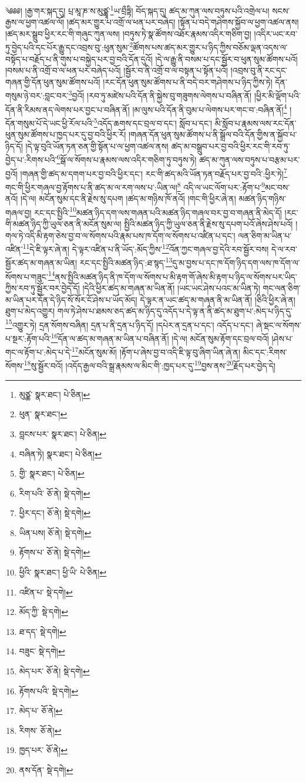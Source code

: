 \setcounter{footnote}{0} 
༄༅༅། །རྒྱ་གར་སྐད་དུ། པྲ་མཱ་ཎ་ས་མུཙྪཱ་\footnote{མུཙྪ་  སྣར་ཐང་།  པེ་ཅིན། }ཡ་བྲྀཏྟི། བོད་སྐད་དུ། ཚད་མ་ཀུན་ལས་བཏུས་པའི་འགྲེལ་པ། སངས་རྒྱས་ལ་ཕྱག་འཚལ་ལོ། །ཚད་མར་གྱུར་པ་འགྲོ་ལ་ཕན་པར་བཞེད། །སྟོན་པ་བདེ་གཤེགས་སྐྱོབ་ལ་ཕྱག་འཚལ་ནས། །ཚད་མར་སྒྲུབ་ཕྱིར་རང་གི་གཞུང་ཀུན་ལས། །བཏུས་ཏེ་སྣ་ཚོགས་འཐོར་རྣམས་འདིར་གཅིག་བྱ། །འདིར་ཡང་རབ་ཏུ་བྱེད་པའི་དང་པོར་རྒྱུ་དང་འབྲས་བུ་:ཕུན་སུམ་\footnote{ཕུན་  སྣར་ཐང་། }ཚོགས་པས་ཚད་མར་གྱུར་པ་ཉིད་ཀྱིས་བཅོམ་ལྡན་འདས་ལ་བསྟོད་པ་བརྗོད་པ་ནི་གུས་པ་བསྐྱེད་པར་བྱ་བའི་དོན་དུའོ། །དེ་ལ་རྒྱུ་ནི་བསམ་པ་དང་སྦྱོར་བ་ཕུན་སུམ་ཚོགས་པའོ། །བསམ་པ་ནི་འགྲོ་བ་ལ་ཕན་པར་བཞེད་པའོ། །སྦྱོར་བ་ནི་འགྲོ་བ་ལ་བསྟན་པ་སྟོན་པའོ། །འབྲས་བུ་ནི་རང་དང་གཞན་གྱི་དོན་ཕུན་སུམ་ཚོགས་པའོ། །རང་དོན་ཕུན་སུམ་ཚོགས་པ་ནི་བདེ་བར་གཤེགས་པ་ཉིད་ཀྱིས་ཏེ། དོན་གསུམ་ཉེ་བར་:བླང་བར་\footnote{བླངས་པར་  སྣར་ཐང་།  པེ་ཅིན། }བྱའོ། །རབ་ཏུ་མཛེས་པའི་དོན་ནི་སྐྱེས་བུ་གཟུགས་ལེགས་པ་བཞིན་ནོ། །ཕྱིར་མི་ལྡོག་པའི་དོན་ནི་རིམས་ནད་ལེགས་པར་བྱང་པ་བཞིན་ནོ། །མ་ལུས་པའི་དོན་ནི་བུམ་པ་ལེགས་པར་གང་བ་:བཞིན་ནོ།\footnote{བཞིན་ཏེ།  སྣར་ཐང་།  པེ་ཅིན། } །དོན་གསུམ་པོ་དེ་ཡང་ཕྱི་རོལ་པའི་\footnote{གྱི་  སྣར་ཐང་།  པེ་ཅིན། }འདོད་ཆགས་དང་བྲལ་བ་དང་། སློབ་པ་དང་། མི་སློབ་པ་རྣམས་ལས་རང་དོན་ཕུན་སུམ་ཚོགས་པ་ཁྱད་པར་དུ་བྱ་བའི་ཕྱིར་རོ། །གཞན་དོན་ཕུན་སུམ་ཚོགས་པ་ནི་སྒྲོལ་བའི་དོན་གྱིས་ན་སྐྱོབ་པ་ཉིད་དོ། །དེ་ལྟ་བུའི་ཡོན་ཏན་ཅན་གྱི་སྟོན་པ་ལ་ཕྱག་འཚལ་ནས། ཚད་མ་བསྒྲུབ་པར་བྱ་བའི་ཕྱིར་རང་གི་རབ་ཏུ་བྱེད་པ་:རིགས་པའི་\footnote{རིག་པའི་  ཅོ་ནེ།  སྡེ་དགེ། }སྒོ་ལ་སོགས་པ་རྣམས་ལས་འདིར་གཅིག་ཏུ་བཏུས་ཏེ། ཚད་མ་ཀུན་ལས་བཏུས་པ་བརྩམ་པར་བྱའོ། །གཞན་གྱི་ཚད་མ་དགག་པར་བྱ་བའི་ཕྱིར་དང་། རང་གི་ཚད་མའི་ཡོན་ཏན་བརྗོད་པར་བྱ་བའི་:ཕྱིར་ཏེ།\footnote{ཕྱིར་དང་།  ཅོ་ནེ།  སྡེ་དགེ། } གང་གི་ཕྱིར་གཞལ་བྱ་རྟོགས་པ་ནི་ཚད་མ་ལ་རག་ལས་པ་:ཡིན་ལ།\footnote{ཡིན་པས།  ཅོ་ནེ།  སྡེ་དགེ། } འདི་ལ་ཡང་ལོག་པར་:རྟོག་པ་\footnote{རྟོགས་པ་  ཅོ་ནེ།  སྡེ་དགེ། }མང་བས་ནའོ། །དེ་ལ། མངོན་སུམ་དང་ནི་རྗེས་སུ་དཔག །ཚད་མ་གཉིས་ཁོ་ནའོ། །གང་གི་ཕྱིར་ཞེ་ན། མཚན་ཉིད་གཉིས་གཞལ་བྱ། རང་དང་སྤྱིའི་\footnote{ཕྱིའི་  སྣར་ཐང་། ཕྱི་ཡི་  པེ་ཅིན། }མཚན་ཉིད་དག་ལས་གཞན་པའི་མཚན་ཉིད་གཞལ་བར་བྱ་བ་གཞན་ནི་མེད་དོ། །རང་གི་མཚན་ཉིད་ཀྱི་ཡུལ་ཅན་ནི་མངོན་སུམ་ལ། སྤྱིའི་མཚན་ཉིད་ཀྱི་ཡུལ་ཅན་ནི་རྗེས་སུ་དཔག་པའོ་ཞེས་ཤེས་པའོ། །གལ་ཏེ་འདི་མི་རྟག་ཅེས་བྱ་བ་ལ་སོགས་པའི་རྣམ་པས་ཁ་དོག་ལ་སོགས་པ་འཛིན་པ་དང་། ལན་ཅིག་མ་ཡིན་པ་འཛིན་\footnote{འཛིན་པ་  སྡེ་དགེ། }དེ་ཇི་ལྟར་ཞེ་ན། དེ་ལྟར་འཛིན་པ་ནི་ཡོད་:མོད་ཀྱིས་\footnote{མོད་ཀྱི་  སྡེ་དགེ། }འོན་ཀྱང་གཞལ་བྱ་དེའི་རབ་སྦྱོར་བས། དེ་ལ་རབ་སྦྱོར་ཚད་མ་གཞན་མ་ཡིན། རང་དང་སྤྱིའི་མཚན་ཉིད་:ཐ་སྙད་\footnote{ཐ་དད་  སྡེ་དགེ། }དུ་མ་བྱས་པ་དང་ཁ་དོག་ཉིད་དག་ལས་ཁ་དོག་ལ་སོགས་པ་གཟུང་\footnote{བཟུང་  སྡེ་དགེ། }ནས་སྤྱིའི་མཚན་ཉིད་ནི་ཁ་དོག་ལ་སོགས་པ་མི་རྟག་གོ་ཞེས་མི་རྟག་པ་ཉིད་ལ་སོགས་པར་ཡིད་ཀྱིས་རབ་ཏུ་སྦྱོར་བར་བྱེད་དོ། །དེའི་ཕྱིར་ཚད་མ་གཞན་མ་ཡིན་ནོ། །ཡང་ཡང་ཤེས་པའང་མ་ཡིན་ཏེ། གང་ལན་ཅིག་མ་ཡིན་པར་དོན་དེ་ཉིད་སོ་སོར་ངོ་ཤེས་པ་ཡོད་མོད། དེ་ལྟར་ན་ཡང་ཚད་མ་གཞན་ནི་མ་ཡིན་ནོ། །ཅིའི་ཕྱིར་ཞེ་ན། ཐུག་པ་མེད་འགྱུར། གལ་ཏེ་ཤེས་པ་ཐམས་ཅད་ཚད་མ་ཉིད་དུ་འདོད་པ་དེ་ལྟ་ན་ནི་ཚད་མ་ཐུག་པ་:མེད་པ་ཉིད་དུ་\footnote{མེད་པར་  ཅོ་ནེ།  སྡེ་དགེ། }འགྱུར་ཏེ། དྲན་སོགས་བཞིན། དྲན་པ་ནི་དྲན་པ་ཉིད་དོ། །དཔེར་ན་དྲན་པ་དང་། འདོད་པ་དང་། ཞེ་སྡང་ལ་སོགས་པ་སྔར་:རྟོག་པའི་\footnote{རྟོགས་པའི་  སྡེ་དགེ། }དོན་ལ་ཚད་མ་གཞན་མ་ཡིན་པ་བཞིན་ནོ། །དེ་ལ། མངོན་སུམ་རྟོག་དང་བྲལ་བའོ། །ཤེས་པ་གང་ལ་རྟོག་པ་:མེད་པ་དེ་\footnote{མེད་པ་  ཅོ་ནེ། }མངོན་སུམ་མོ། །རྟོག་པ་ཞེས་བྱ་བ་འདི་ཇི་ལྟ་བུ་ཞིག་ཡིན་ཞེ་ན། མིང་དང་:རིགས་སོགས་\footnote{རིགས་  ཅོ་ནེ། }སུ་སྦྱོར་བའོ། །འདོད་རྒྱལ་བའི་སྒྲ་རྣམས་ལ་མིང་གི་:ཁྱད་པར་དུ་\footnote{ཁྱད་པར་  ཅོ་ནེ། }བྱས་ནས་\footnote{ནས་དོན་  སྡེ་དགེ། }རྗོད་པར་བྱེད་དེ། 